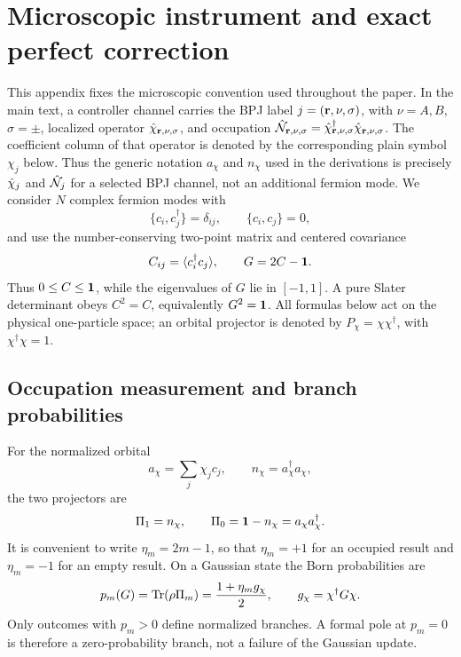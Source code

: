 \appendix

\section{Microscopic instrument and exact perfect correction}
\label{app:microscopic-instrument}

This appendix fixes the microscopic convention used throughout the paper.  In
the main text, a controller channel carries the BPJ label
\(j=({\bf r},\nu,\sigma)\), with \(\nu=A,B\), \(\sigma=\pm\), localized operator
\(\hat{\chi}_{{\bf r},\nu,\sigma}\), and occupation
\(\hat{\mathcal{N}}_{{\bf r},\nu,\sigma}=\hat{\chi}_{{\bf r},\nu,\sigma}^\dagger
\hat{\chi}_{{\bf r},\nu,\sigma}\).  The coefficient column of that operator is
denoted by the corresponding plain symbol \(\chi_j\) below.  Thus the generic
notation \(a_\chi\) and \(n_\chi\) used in the derivations is precisely
\(\hat{\chi}_j\) and \(\hat{\mathcal{N}}_j\) for a selected BPJ channel, not an additional
fermion mode.  We consider \(N\) complex fermion modes with
\begin{equation}
    \{c_i,c_j^\dagger\}=\delta_{ij},
    \qquad
    \{c_i,c_j\}=0,
\end{equation}
and use the number-conserving two-point matrix and centered covariance
\begin{equation}
    C_{ij}=\langle c_i^\dagger c_j\rangle,
    \qquad
    G=2C-\mathbf{1} .
    \label{eq:app-C-G-convention}
\end{equation}
Thus \(0\le C\le\mathbf{1}\), while the eigenvalues of \(G\) lie in
\([-1,1]\).  A pure Slater determinant obeys \(C^2=C\), equivalently
\(G^2=\mathbf{1}\).  All formulas below act on the physical one-particle space; an
orbital projector is denoted by \(P_\chi=\chi\chi^\dagger\), with
\(\chi^\dagger\chi=1\).

\subsection{Occupation measurement and branch probabilities}

For the normalized orbital
\begin{equation}
    a_\chi=\sum_j\chi_j c_j,
    \qquad
    n_\chi=a_\chi^\dagger a_\chi,
\end{equation}
the two projectors are
\begin{equation}
    \Pi_1=n_\chi,
    \qquad
    \Pi_0=\mathbf{1}-n_\chi=a_\chi a_\chi^\dagger.
    \label{eq:app-occupation-projectors}
\end{equation}
It is convenient to write \(\eta_m=2m-1\), so that \(\eta_m=+1\)
for an occupied result and \(\eta_m=-1\) for an empty result.  On a
Gaussian state the Born probabilities are
\begin{equation}
    p_m(G)=\operatorname{Tr}(\rho\Pi_m)
    =\frac{1+\eta_m g_\chi}{2},
    \qquad
    g_\chi=\chi^\dagger G\chi.
    \label{eq:app-binary-born-probability}
\end{equation}
Only outcomes with \(p_m>0\) define normalized branches.  A formal pole at
\(p_m=0\) is therefore a zero-probability branch, not a failure of the
Gaussian update.

